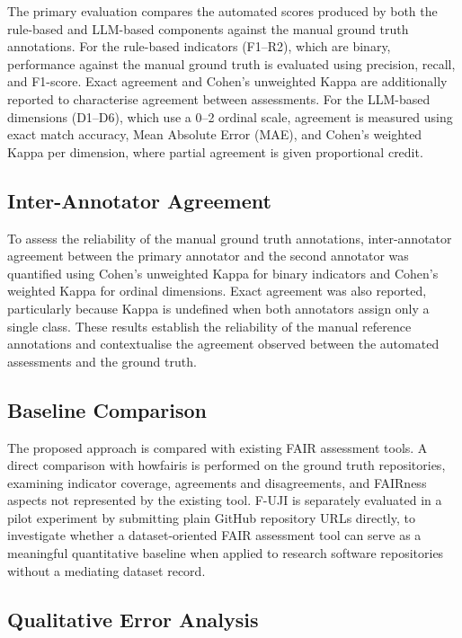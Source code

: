 The primary evaluation compares the automated scores produced by
both the rule-based and LLM-based components against the manual
ground truth annotations. For the rule-based indicators (F1--R2),
which are binary, performance against the manual ground truth is
evaluated using precision, recall, and F1-score. Exact agreement and
Cohen's unweighted Kappa are additionally reported to characterise
agreement between assessments. For the LLM-based dimensions
(D1--D6), which use a 0--2 ordinal scale, agreement is measured
using exact match accuracy, Mean Absolute Error (MAE), and Cohen's
weighted Kappa per dimension, where partial agreement is given
proportional credit.

\subsection{Inter-Annotator Agreement}

To assess the reliability of the manual ground truth annotations,
inter-annotator agreement between the primary annotator and the
second annotator was quantified using Cohen's unweighted Kappa for
binary indicators and Cohen's weighted Kappa for ordinal dimensions.
Exact agreement was also reported, particularly because Kappa is
undefined when both annotators assign only a single class. These
results establish the reliability of the manual reference
annotations and contextualise the agreement observed between the
automated assessments and the ground truth.

\subsection{Baseline Comparison}

The proposed approach is compared with existing FAIR assessment
tools. A direct comparison with howfairis is performed on the
ground truth repositories, examining indicator coverage, agreements
and disagreements, and FAIRness aspects not represented by the
existing tool. F-UJI is separately evaluated in a pilot experiment
by submitting plain GitHub repository URLs directly, to investigate
whether a dataset-oriented FAIR assessment tool can serve as a
meaningful quantitative baseline when applied to research software
repositories without a mediating dataset record.

\subsection{Qualitative Error Analysis}

